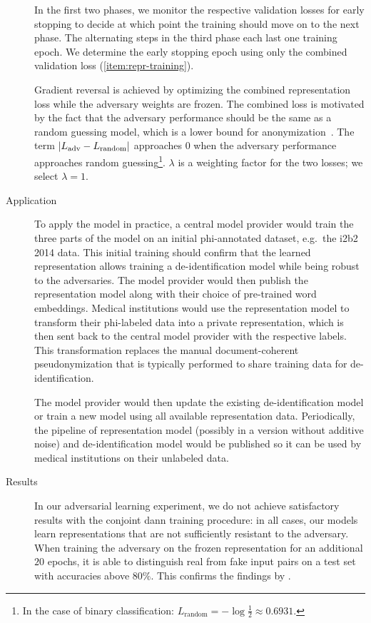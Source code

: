 \begin{description}
    In the first two phases, we monitor the respective validation losses for early stopping to decide at which point the training should move on to the next phase.
    The alternating steps in the third phase each last one training epoch.
    We determine the early stopping epoch using only the combined validation loss (\cref{item:repr-training}).
    
    Gradient reversal is achieved by optimizing the combined representation loss while the adversary weights are frozen.
    The combined loss is motivated by the fact that the adversary performance should be the same as a random guessing model, which is a lower bound for anonymization~\citep{feutry2018learning}.
    The term $\lvert L_{\text{adv}} - L_{\text{random}}\rvert$ approaches $0$ when the adversary performance approaches random guessing\footnote{In the case of binary classification: $L_{\text{random}} = -\log \frac{1}{2} \approx 0.6931$.}.
    $\lambda$ is a weighting factor for the two losses; we select $\lambda=1$.
    
    \item[Application]
    To apply the model in practice, a central model provider would train the three parts of the model on an initial \ac{phi}-annotated dataset, e.g.\ the i2b2 2014 data.
    This initial training should confirm that the learned representation allows training a de-identification model while being robust to the adversaries.
    The model provider would then publish the representation model along with their choice of pre-trained word embeddings.
    Medical institutions would use the representation model to transform their \ac{phi}-labeled data into a private representation, which is then sent back to the central model provider with the respective labels.
    This transformation replaces the manual document-coherent pseudonymization that is typically performed to share training data for de-identification.
    
    The model provider would then update the existing de-identification model or train a new model using all available representation data.
    Periodically, the pipeline of representation model (possibly in a version without additive noise) and de-identification model would be published so it can be used by medical institutions on their unlabeled data.

    \item[Results]
    In our adversarial learning experiment, we do not achieve satisfactory results with the conjoint \ac{dann} training procedure: in all cases, our models learn representations that are not sufficiently resistant to the adversary.
    When training the adversary on the frozen representation for an additional $20$ epochs, it is able to distinguish real from fake input pairs on a test set with accuracies above $80\%$.
    This confirms the findings by \citet{elazar2018adversarial}.
    

\end{description}
